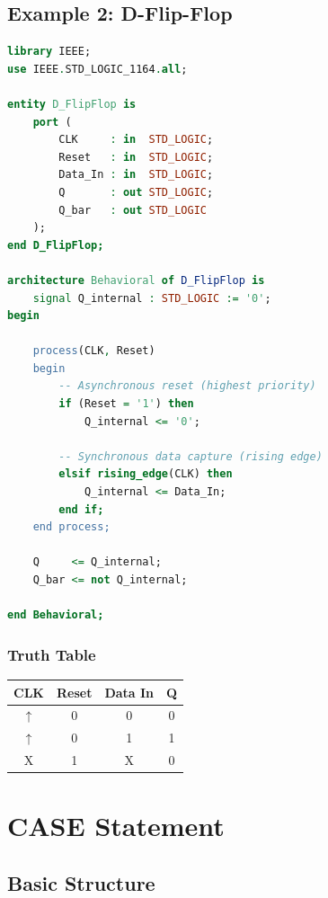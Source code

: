 \documentclass[12pt,a4paper]{article}
\begin{document}
\newpage
\subsection{Example 2: D-Flip-Flop}

\begin{lstlisting}[language=VHDL]
library IEEE;
use IEEE.STD_LOGIC_1164.all;

entity D_FlipFlop is
    port (
        CLK     : in  STD_LOGIC;
        Reset   : in  STD_LOGIC;
        Data_In : in  STD_LOGIC;
        Q       : out STD_LOGIC;
        Q_bar   : out STD_LOGIC
    );
end D_FlipFlop;

architecture Behavioral of D_FlipFlop is
    signal Q_internal : STD_LOGIC := '0';
begin
    
    process(CLK, Reset)
    begin
        -- Asynchronous reset (highest priority)
        if (Reset = '1') then
            Q_internal <= '0';
            
        -- Synchronous data capture (rising edge)
        elsif rising_edge(CLK) then
            Q_internal <= Data_In;
        end if;
    end process;
    
    Q     <= Q_internal;
    Q_bar <= not Q_internal;
    
end Behavioral;
\end{lstlisting}

\subsubsection{Truth Table}

\begin{table}[h]
\centering
\begin{tabular}{|c|c|c|c|}
\hline
\textbf{CLK} & \textbf{Reset} & \textbf{Data In} & \textbf{Q} \\
\hline
$\uparrow$ & 0 & 0 & 0 \\
\hline
$\uparrow$ & 0 & 1 & 1 \\
\hline
X & 1 & X & 0 \\
\hline
\end{tabular}
\end{table}

\newpage
\section{CASE Statement}

\subsection{Basic Structure}
\end{document}
